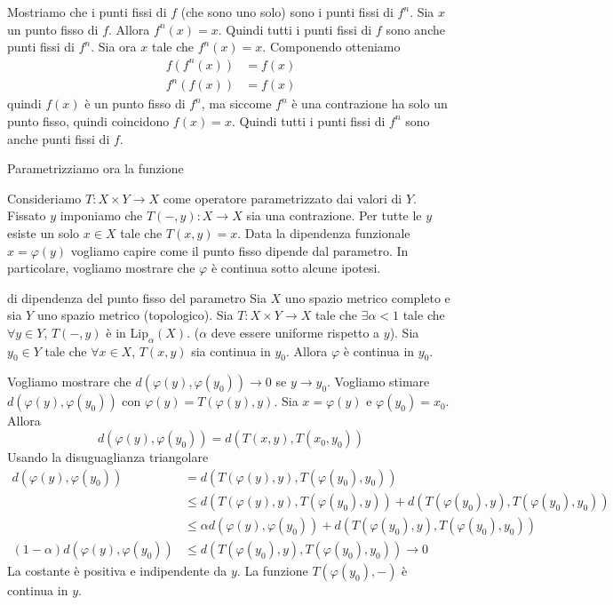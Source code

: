 \documentclass[a4paper]{article}
\begin{document}
\begin{snippetproof}{}
    Mostriamo che i punti fissi di \(f\) (che sono uno solo) sono i punti fissi di \(f^n\).
    Sia \(x\) un punto fisso di \(f\). Allora \(f^n(x) = x\).
    Quindi tutti i punti fissi di \(f\) sono anche punti fissi di \(f^n\).
    Sia ora \(x\) tale che \(f^n(x)=x\). Componendo otteniamo
    \begin{align*}
        f(f^n(x)) &= f(x) \\
        f^n(f(x)) &= f(x)
    \end{align*}
    quindi \(f(x)\) è un punto fisso di \(f^n\), ma siccome \(f^n\) è una contrazione
    ha solo un punto fisso, quindi coincidono \(f(x)=x\).
    Quindi tutti i punti fissi di \(f^n\) sono anche punti fissi di \(f\).
\end{snippetproof}

Parametrizziamo ora la funzione

Consideriamo \(T \colon X \times Y \to X\) come operatore parametrizzato dai valori di \(Y\).
Fissato \(y\) imponiamo che \(T(-, y): X \to X\) sia una contrazione.
Per tutte le \(y\) esiste un solo \(x\in X\) tale che \(T(x,y) = x\).
Data la dipendenza funzionale \(x=\varphi(y)\) vogliamo capire come il punto fisso dipende dal parametro.
In particolare, vogliamo mostrare che \(\varphi\) è continua sotto alcune ipotesi.

\begin{snippettheorem}{di dipendenza del punto fisso del parametro}
    Sia \(X\) uno spazio metrico completo e sia \(Y\) uno spazio metrico (topologico).
    Sia \(T \colon X \times Y \to X\) tale che \(\exists \alpha < 1\) tale che
    \(\forall y \in Y\), \(T(-,y)\) è in \(\text{Lip}_\alpha(X)\). (\(\alpha\) deve
    essere uniforme rispetto a \(y\)).
    Sia \(y_0 \in Y\) tale che \(\forall x \in X\), \(T(x,y)\) sia continua in \(y_0\).
    Allora \(\varphi\) è continua in \(y_0\).
\end{snippettheorem}

\begin{snippetproof}{}
    Vogliamo mostrare che \(d(\varphi(y), \varphi(y_0)) \to 0\) se \(y \to y_0\).
    Vogliamo stimare \(d(\varphi(y), \varphi(y_0))\) con \(\varphi(y) = T(\varphi(y), y)\).
    Sia \(x = \varphi(y)\) e \(\varphi(y_0) = x_0\). Allora
    \[
        d(\varphi(y), \varphi(y_0)) = d(T(x,y), T(x_0, y_0))
    \]
    Usando la disuguaglianza triangolare
    \begin{align*}
        d(\varphi(y), \varphi(y_0))
        &= d(T(\varphi(y), y), T(\varphi(y_0), y_0)) \\
        &\leq d(T(\varphi(y), y), T(\varphi(y_0), y)) +
        d(T(\varphi(y_0), y), T(\varphi(y_0), y_0)) \\
        &\leq \alpha d(\varphi(y), \varphi(y_0))
        + d(T(\varphi(y_0), y), T(\varphi(y_0), y_0)) \\
        (1-\alpha) d(\varphi(y), \varphi(y_0))
        &\leq d(T(\varphi(y_0), y), T(\varphi(y_0), y_0)) \to 0
    \end{align*}
    La costante è positiva e indipendente da \(y\).
    La funzione \(T(\varphi(y_0), -)\) è continua in \(y\).
\end{snippetproof}
\end{document}
